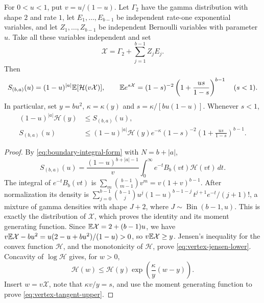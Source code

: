 \begin{lemma}
\label{lem:vertex-randomization}
For $0<u<1$, put $v=u/(1-u)$. Let $\Gamma_2$ have the gamma distribution
with shape $2$ and rate $1$, let $E_1,\ldots,E_{b-1}$ be independent
rate-one exponential variables, and let $Z_1,\ldots,Z_{b-1}$ be
independent Bernoulli variables with parameter $u$. Take all these
variables independent and set
\[
 \mathcal X=\Gamma_2+\sum_{j=1}^{b-1}Z_jE_j.
\]
Then
\begin{equation}\label{eq:vertex-randomization}
 S_{(b,a)}(u)=(1-u)^{|a|}\mathbb E[\mathcal H(v\mathcal X)],\qquad
 \mathbb E e^{s\mathcal X}=(1-s)^{-2}
 \left(1+\frac{us}{1-s}\right)^{b-1}\quad(s<1).
\end{equation}
In particular, set $y=bu^2$, $\kappa=\kappa(y)$ and
$s=\kappa/[bu(1-u)]$. Whenever $s<1$,
\begin{align}
 (1-u)^{|a|} \mathcal H(y)&\le S_{(b,a)}(u),\label{eq:vertex-jensen-lower}\\
 S_{(b,a)}(u)&\le (1-u)^{|a|} \mathcal H(y)e^{-\kappa}(1-s)^{-2}
 \left(1+\frac{us}{1-s}\right)^{b-1}.
 \label{eq:vertex-tangent-upper}
\end{align}
\end{lemma}

\begin{proof}
By \eqref{eq:boundary-integral-form} with $N=b+|a|$,
\[
 S_{(b,a)}(u)=\frac{(1-u)^{b+|a|-1}}v
 \int_0^\infty e^{-t}B_b(vt)\mathcal H(vt)\,dt.
\]
The integral of $e^{-t}B_b(vt)$ is $\sum_m\binom{b-1}{m-1}v^m=v(1+v)^{b-1}$.
After normalization its density is
$\sum_{j=0}^{b-1}\binom{b-1}ju^j(1-u)^{b-1-j}\,t^{j+1}e^{-t}/(j+1)!$, a mixture of
gamma densities with shape $J+2$, where $J\sim\operatorname{Bin}(b-1,u)$. This is
exactly the distribution of $\mathcal X$, which proves the identity and its
moment generating function. Since $\mathbb E\mathcal X=2+(b-1)u$, we have
$v\mathbb E\mathcal X-bu^2=u(2-u+bu^2)/(1-u)>0$, so $v\mathbb E\mathcal X\ge y$.
Jensen's inequality for the convex function $\mathcal H$, and the monotonicity of $\mathcal H$,
prove \eqref{eq:vertex-jensen-lower}. Concavity of $\log\mathcal H$ gives, for $w>0$,
\[
 \mathcal H(w)\le \mathcal H(y)\exp\!\left(\frac{\kappa}{y}(w-y)\right).
\]
Insert $w=v\mathcal X$, note that $\kappa v/y=s$, and use the moment
generating function to prove \eqref{eq:vertex-tangent-upper}.
\end{proof}

